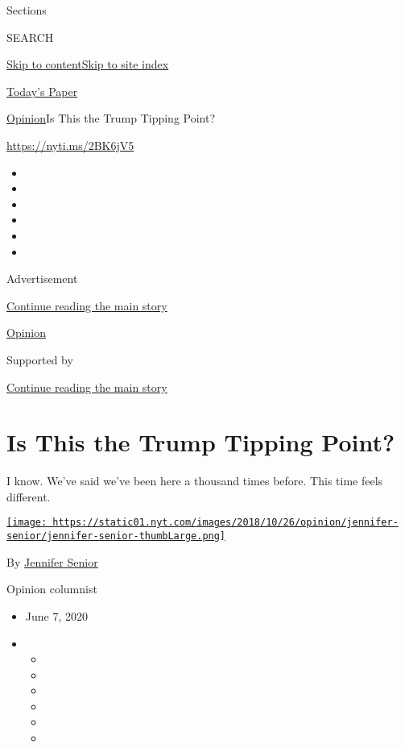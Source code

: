Sections

SEARCH

\protect\hyperlink{site-content}{Skip to
content}\protect\hyperlink{site-index}{Skip to site index}

\href{https://myaccount.nytimes.com/auth/login?response_type=cookie\&client_id=vi}{}

\href{https://www.nytimes.com/section/todayspaper}{Today's Paper}

\href{/section/opinion}{Opinion}\textbar{}Is This the Trump Tipping
Point?

\href{https://nyti.ms/2BK6jV5}{https://nyti.ms/2BK6jV5}

\begin{itemize}
\item
\item
\item
\item
\item
\item
\end{itemize}

Advertisement

\protect\hyperlink{after-top}{Continue reading the main story}

\href{/section/opinion}{Opinion}

Supported by

\protect\hyperlink{after-sponsor}{Continue reading the main story}

\hypertarget{is-this-the-trump-tipping-point}{%
\section{Is This the Trump Tipping
Point?}\label{is-this-the-trump-tipping-point}}

I know. We've said we've been here a thousand times before. This time
feels different.

\href{https://www.nytimes.com/by/jennifer-senior}{\texttt{[image: https://static01.nyt.com/images/2018/10/26/opinion/jennifer-senior/jennifer-senior-thumbLarge.png]}}

By \href{https://www.nytimes.com/by/jennifer-senior}{Jennifer Senior}

Opinion columnist

\begin{itemize}
\item
  June 7, 2020
\item
  \begin{itemize}
  \item
  \item
  \item
  \item
  \item
  \item
  \end{itemize}
\end{itemize}

